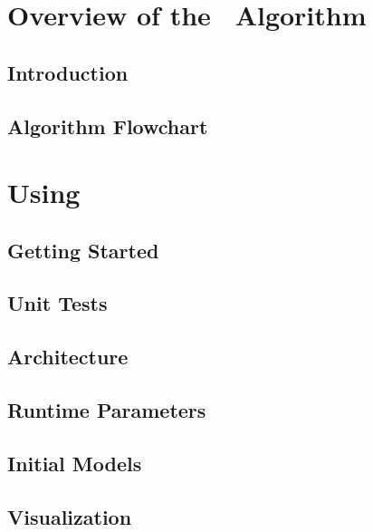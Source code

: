 \documentclass[11pt]{book}    %
\begin{document}
\mainmatter


\part{Overview of the \maestro\ Algorithm}

\chapter{Introduction}


\chapter{Algorithm Flowchart}
\label{ch:flowchart}


\part{Using \maestro}

\chapter{Getting Started}


\chapter{Unit Tests}


\chapter{Architecture}


\chapter{Runtime Parameters}
\label{ch:runtimeparameters}



\chapter{Initial Models}


\chapter{Visualization}

\end{document}
